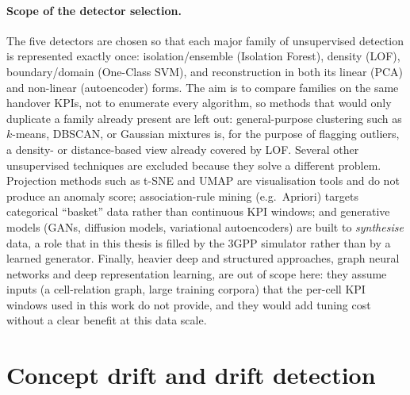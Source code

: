 \paragraph{Scope of the detector selection.}
The five detectors are chosen so that each major family of unsupervised
detection is represented exactly once: isolation/ensemble (Isolation Forest),
density (LOF), boundary/domain (One-Class SVM), and reconstruction in both its
linear (PCA) and non-linear (autoencoder) forms. The aim is to compare families
on the same handover KPIs, not to enumerate every algorithm, so methods that
would only duplicate a family already present are left out: general-purpose
clustering such as $k$-means, DBSCAN, or Gaussian mixtures is, for the purpose of
flagging outliers, a density- or distance-based view already covered by LOF.
Several other unsupervised techniques are excluded because they solve a different
problem. Projection methods such as t-SNE and UMAP are visualisation tools and do
not produce an anomaly score; association-rule mining (e.g.\ Apriori) targets
categorical ``basket'' data rather than continuous KPI windows; and generative
models (GANs, diffusion models, variational autoencoders) are built to
\emph{synthesise} data, a role that in this thesis is filled by the 3GPP
simulator rather than by a learned generator. Finally, heavier deep and
structured approaches, graph neural networks and deep representation learning,
are out of scope here: they assume inputs (a cell-relation graph, large training
corpora) that the per-cell KPI windows used in this work do not provide, and they
would add tuning cost without a clear benefit at this data scale.

\section{Concept drift and drift detection}
\label{sec:drift-background}

